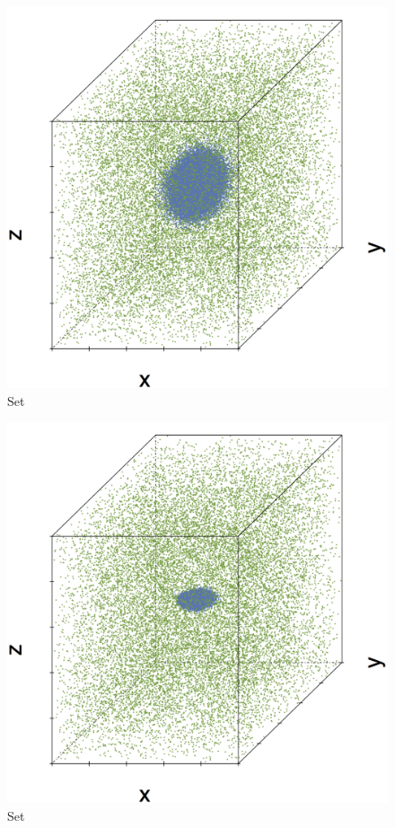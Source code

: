 \begin{subfigure}{0.23\textwidth}
	\centering
	\includegraphics[width=\textwidth]{experiment/img/datasetplot_ferdosi_1_60000.png}
	\caption{Set \ferdosiOne}
	\label{fig:3:simulated:datasets:ferdosi1}
\end{subfigure}
\begin{subfigure}{0.23\textwidth}
	\centering
	\includegraphics[width=\textwidth]{experiment/img/datasetplot_baakman_1_60000.png}
	\caption{Set \baakmanOne}
	\label{fig:3:simulated:datasets:baakman1}
\end{subfigure}
